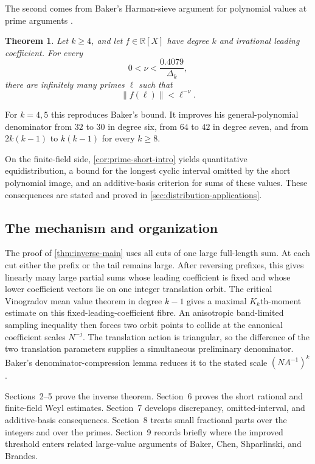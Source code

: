 \documentclass[11pt,reqno]{amsart}
\numberwithin{equation}{section}
\newtheorem{theorem}{Theorem}[section]
\theoremstyle{definition}
\theoremstyle{remark}
\begin{document}
The second comes from Baker's Harman-sieve argument for polynomial values at
prime arguments \cite{BakerPrimes2017}.

\begin{theorem}\label{thm:prime-fractional-parts-intro}
Let $k\ge4$, and let $f\in\mathbb R[X]$ have degree $k$ and irrational
leading coefficient.  For every
\begin{equation}\label{eq:prime-nu-range}
  0<\nu<\frac{0.4079}{\Delta_k},
\end{equation}
there are infinitely many primes $\ell$ such that
\begin{equation}\label{eq:prime-fractional-parts}
  \|f(\ell)\|<\ell^{-\nu}.
\end{equation}
\end{theorem}

For $k=4,5$ this reproduces Baker's bound.  It improves his
general-polynomial denominator from $32$ to $30$ in degree six, from $64$ to
$42$ in degree seven, and from $2k(k-1)$ to $k(k-1)$ for every $k\ge8$.

On the finite-field side, \cref{cor:prime-short-intro} yields quantitative
equidistribution, a bound for the longest cyclic interval omitted by the short
polynomial image, and an additive-basis criterion for sums of these values.
These consequences are stated and proved in
\cref{sec:distribution-applications}.

\subsection{The mechanism and organization}

The proof of \cref{thm:inverse-main} uses all cuts of one large full-length
sum.  At each cut either the prefix or the tail remains large.  After
reversing prefixes, this gives linearly many large partial sums whose leading
coefficient is fixed and whose lower coefficient vectors lie on one integer
translation orbit.  The critical Vinogradov mean value theorem in degree
$k-1$ gives a maximal $K_k$th-moment estimate on this fixed-leading-coefficient
fibre.  An anisotropic band-limited sampling inequality then forces two orbit
points to collide at the canonical coefficient scales $N^{-j}$.  The
translation action is triangular, so the difference of the two translation
parameters supplies a simultaneous preliminary denominator.  Baker's
denominator-compression lemma reduces it to the stated scale $(NA^{-1})^k$.

Sections~2--5 prove the inverse theorem.  Section~6 proves the short rational
and finite-field Weyl estimates.  Section~7 develops discrepancy,
omitted-interval, and additive-basis consequences.  Section~8 treats small
fractional parts over the integers and over the primes.  Section~9 records
briefly where the improved threshold enters related large-value arguments of
Baker, Chen, Shparlinski, and Brandes.
\end{document}
